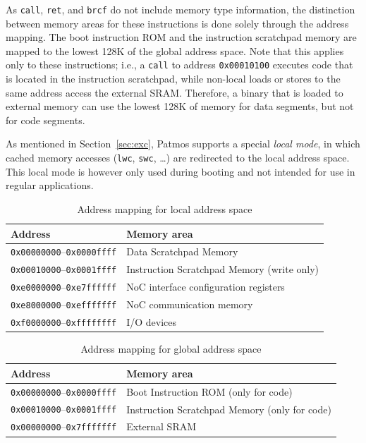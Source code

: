 \documentclass[a4paper,fontsize=10pt,twoside,DIV15,BCOR12mm,headinclude=true,footinclude=false,pagesize,bibtotoc]{scrbook}
\newcommand{\code}[1]{{\texttt{#1}}}
\begin{document}
As \code{call}, \code{ret}, and \code{brcf} do not include memory type
information, the distinction between memory areas for these
instructions is done solely through the address mapping. The boot instruction ROM
and the instruction scratchpad memory are mapped to the lowest 128K of
the global address space. Note that this applies only to these
instructions; i.e., a \code{call} to address \code{0x00010100}
executes code that is located in the instruction scratchpad, while
non-local loads or stores to the same address access the external
SRAM. Therefore, a binary that is loaded to external memory can use
the lowest 128K of memory for data segments, but not for code
segments.

As mentioned in Section~\ref{sec:exc}, Patmos supports a special
\emph{local mode}, in which cached memory accesses (\texttt{lwc},
\texttt{swc}, \dots) are redirected to the local address space. This
local mode is however only used during booting and not intended for
use in regular applications.

\begin{table}
\centering
\begin{tabular}{ll}
\toprule
Address & Memory area \\
\midrule
\code{0x00000000}--\code{0x0000ffff} & Data Scratchpad Memory \\
\code{0x00010000}--\code{0x0001ffff} & Instruction Scratchpad Memory (write only) \\
\code{0xe0000000}--\code{0xe7ffffff} & NoC interface configuration registers \\
\code{0xe8000000}--\code{0xefffffff} & NoC communication memory \\
\code{0xf0000000}--\code{0xffffffff} & I/O devices \\
\bottomrule
\end{tabular}
\caption{Address mapping for local address space}
\label{tab:lmmap}
\end{table}

\begin{table}
\centering
\begin{tabular}{ll}
\toprule
Address & Memory area \\
\midrule
\code{0x00000000}--\code{0x0000ffff} & Boot Instruction ROM (only for code) \\
\code{0x00010000}--\code{0x0001ffff} & Instruction Scratchpad Memory (only for code) \\
\code{0x00000000}--\code{0x7fffffff} & External SRAM \\
\bottomrule
\end{tabular}
\caption{Address mapping for global address space}
\label{tab:gmmap}
\end{table}
\end{document}
